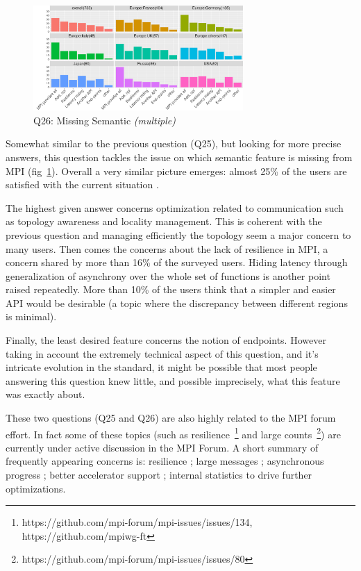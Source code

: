 \documentclass[conference,10pt,letterpaper]{IEEEtran}
\begin{document}
{\begin{figure}[htb]
\begin{center}
\includegraphics[width=8cm]{R-scripts/Q26.pdf}
\caption{Q26: Missing Semantic {\it(multiple)}}
\label{fig:com_sem}
\end{center}
\end{figure}

Somewhat similar to the previous question (Q25), but looking for more
precise answers, this question tackles the issue on which semantic
feature is missing from MPI (fig~\ref{fig:com_sem}). Overall a very
similar picture emerges: almost 25\% of the users are satisfied with
the current situation .

The highest given answer concerns optimization related to
communication such as topology awareness and locality management. This
is coherent with the previous question and managing efficiently the
topology seem a major concern to many users. Then comes the concerns
about the lack of resilience in MPI, a concern shared by more than
16\% of the surveyed users. Hiding latency through generalization of
asynchrony over the whole set of functions is another point raised
repeatedly. More than 10\% of the users think that a simpler and
easier API would be desirable (a topic where the discrepancy between
different regions is minimal).

Finally, the least desired feature concerns the notion of endpoints.
However taking in account the extremely technical aspect of this
question, and it's intricate evolution in the standard, it might be
possible that most people answering this question knew little, and
possible imprecisely, what this feature was exactly about.


These two questions (Q25 and Q26) are also highly related to the MPI forum effort. 
In fact some of these topics (such as
resilience~\footnote{https://github.com/mpi-forum/mpi-issues/issues/134,
https://github.com/mpiwg-ft} and large
counts~\footnote{https://github.com/mpi-forum/mpi-issues/issues/80}) are
currently under active discussion in the MPI Forum.
%
A short summary of frequently appearing concerns is: resilience ;
large messages ; asynchronous progress ; better accelerator support ;
internal statistics to drive further optimizations.
}
  
\end{document}
